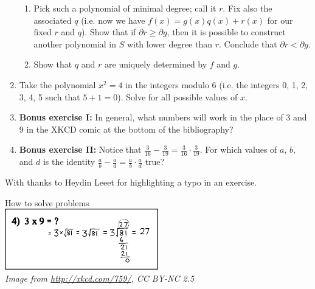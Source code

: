 \documentclass[a4paper,10pt,titlepage]{article}
\theoremstyle{definition}
\begin{document}
\begin{enumerate}
\begin{enumerate}
      \item Pick such a polynomial of minimal degree; call it $ r $. Fix also the associated $ q $ (i.e. now we have $ f(x) = g(x) q(x) + r(x) $ for
            our fixed $ r $ and $ q $). Show that if $ \partial r \geq \partial g $, then it is possible to construct another polynomial in $ S $ with
            lower degree than $ r $. Conclude that $ \partial r < \partial g $.
      \item Show that $ q $ and $ r $ are uniquely determined by $ f $ and $ g $.
    \end{enumerate}
  \item Take the polynomial $ x^2 = 4 $ in the integers modulo 6 (i.e. the integers 0, 1, 2, 3, 4, 5
        such that $ 5 + 1 = 0 $). Solve for all possible values of $ x $.
  \item \textbf{Bonus exercise I:} In general, what numbers will work in the place of $ 3 $ and $ 9 $ in the XKCD
        comic at the bottom of the bibliography?
  \item \textbf{Bonus exercise II:} Notice that $ \frac{3}{16} - \frac{3}{19} = \frac{3}{16} \cdot \frac{3}{19} $.
        For which values of $ a $, $ b $, and $ d $ is the identity $ \frac{a}{b} - \frac{a}{d} = \frac{a}{b} \cdot \frac{a}{d} $ true?
\end{enumerate}

\newpage
\nocite{*}
\printbibliography[title=Bibliography and Further Reading, heading=bibnumbered]

With thanks to Heydin Leeet for highlighting a typo in an exercise.

\vspace{\fill}

\begin{center}
  How to solve problems\\
  \includegraphics[width=0.5\textwidth]{3x9}\\
  \small{\textit{Image from \url{http://xkcd.com/759/}, CC BY-NC 2.5}}
\end{center}
\end{document}
